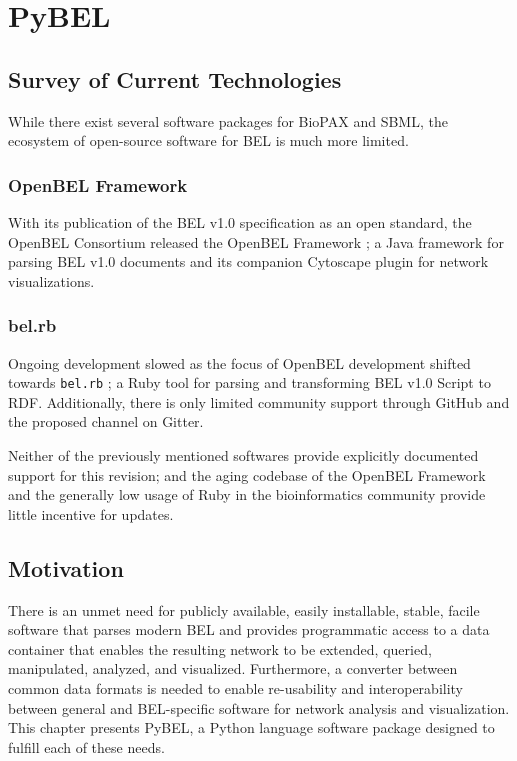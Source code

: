 \chapter{PyBEL}
\label{ch:pybel}

\section{Survey of Current Technologies}

While there exist several software packages for \ac{BioPAX} and \ac{SBML}, the ecosystem of open-source software for \ac{BEL} is much more limited.

\subsection{OpenBEL Framework}

With its publication of the \ac{BEL} v1.0 specification as an open standard, the OpenBEL Consortium released the OpenBEL Framework \cite{openbelframework} ; a Java framework for parsing BEL v1.0 documents and its companion Cytoscape plugin \cite{openbelframeworkcytoscapeplugins} for network visualizations.

\subsection{bel.rb}
Ongoing development slowed \cite{openbelframeworkgraphs} as the focus of OpenBEL development shifted towards \verb|bel.rb| \cite{belrb}; a Ruby tool for parsing and transforming BEL v1.0 Script to \ac{RDF}. Additionally, there is only limited community support through GitHub and the proposed channel on Gitter.

Neither of the previously mentioned softwares provide explicitly documented support for this revision; and the aging codebase of the OpenBEL Framework and the generally low usage of Ruby in the bioinformatics community provide little incentive for updates. 

\section{Motivation}

There is an unmet need for publicly available, easily installable, stable, facile software that parses modern BEL and provides programmatic access to a data container that enables the resulting network to be extended, queried, manipulated, analyzed, and visualized. Furthermore, a converter between common data formats is needed to enable re-usability and interoperability between general and BEL-specific software for network analysis and visualization. This chapter presents PyBEL, a Python language software package designed to fulfill each of these needs.

